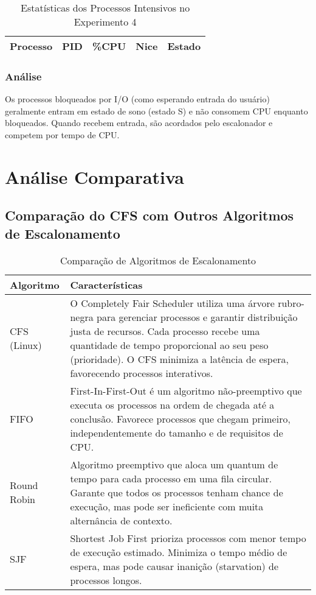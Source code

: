 \documentclass{article}
\begin{document}
\begin{table}[H]
\centering
\caption{Estatísticas dos Processos Intensivos no Experimento 4}
\begin{tabular}{lrrrc}
\toprule
\textbf{Processo} & \textbf{PID} & \textbf{\%CPU} & \textbf{Nice} & \textbf{Estado} \\
\midrule
\bottomrule
\end{tabular}
\end{table}

\subsubsection{Análise}
Os processos bloqueados por I/O (como esperando entrada do usuário) geralmente
entram em estado de sono (estado S) e não consomem CPU enquanto bloqueados.
Quando recebem entrada, são acordados pelo escalonador e competem por tempo de CPU.

\section{Análise Comparativa}

\subsection{Comparação do CFS com Outros Algoritmos de Escalonamento}

\begin{table}[H]
\centering
\caption{Comparação de Algoritmos de Escalonamento}
\begin{tabular}{lp{12cm}}
\toprule
\textbf{Algoritmo} & \textbf{Características} \\
\midrule
CFS (Linux) & O Completely Fair Scheduler utiliza uma árvore rubro-negra para gerenciar processos e garantir distribuição justa de recursos. Cada processo recebe uma quantidade de tempo proporcional ao seu peso (prioridade). O CFS minimiza a latência de espera, favorecendo processos interativos. \\
\midrule
FIFO & First-In-First-Out é um algoritmo não-preemptivo que executa os processos na ordem de chegada até a conclusão. Favorece processos que chegam primeiro, independentemente do tamanho e de requisitos de CPU. \\
\midrule
Round Robin & Algoritmo preemptivo que aloca um quantum de tempo para cada processo em uma fila circular. Garante que todos os processos tenham chance de execução, mas pode ser ineficiente com muita alternância de contexto. \\
\midrule
SJF & Shortest Job First prioriza processos com menor tempo de execução estimado. Minimiza o tempo médio de espera, mas pode causar inanição (starvation) de processos longos. \\
\bottomrule
\end{tabular}
\end{table}
\end{document}
